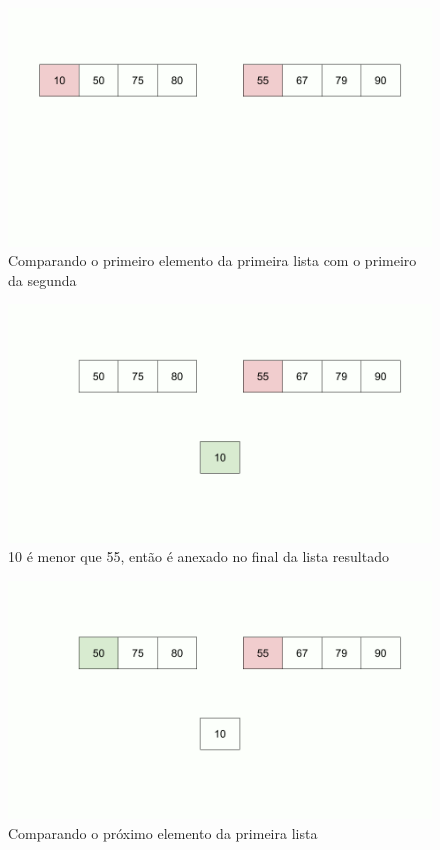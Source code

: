 \begin{figure}[!ht]
	\centering
	\includegraphics[scale=0.3]{figures/merge/merge-function-1.png}
	\caption{Comparando o primeiro elemento da primeira lista com o primeiro da segunda}
\end{figure}
\begin{figure}[!ht]
	\centering
	\includegraphics[scale=0.3]{figures/merge/merge-function-3.png}
	\caption{10 é menor que 55, então é anexado no final da lista resultado}
\end{figure}
\begin{figure}[!ht]
	\centering
	\includegraphics[scale=0.3]{figures/merge/merge-function-5.png}
	\caption{Comparando o próximo elemento da primeira lista}
\end{figure}
